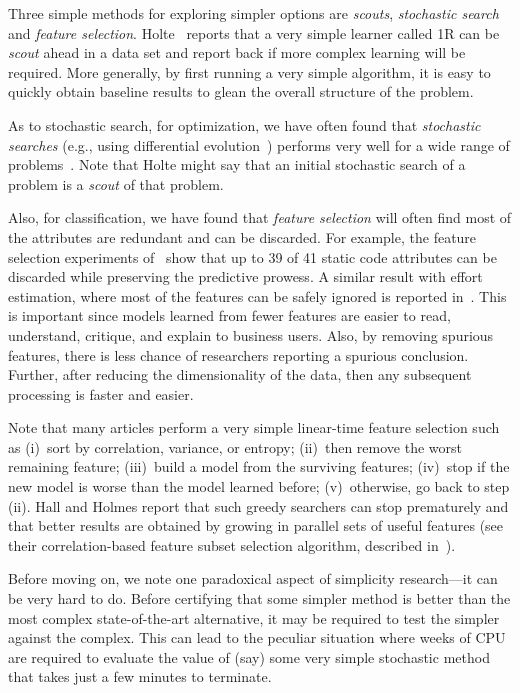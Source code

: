 \documentclass[preprint,10pt]{elsarticle}
\begin{document}
Three simple methods for exploring simpler options are {\em scouts}, {\em stochastic search} and {\em feature selection}. Holte~\cite{Holte1993} reports that a very simple learner called 1R can be {\em scout} ahead in a data set and report back if more complex learning will be required. More generally, by first running a very simple algorithm, it is easy to quickly obtain baseline results to glean the overall structure of the problem.

As to stochastic search, for optimization, we have often found that {\em stochastic searches} (e.g., using differential evolution~\cite{Storn1997}) performs very well for a wide range of problems~\cite{fu2016, agrawal16, agrawal18}.  Note that Holte might say that an initial stochastic search of a problem is a {\em scout} of that problem.

Also, for classification, we have found that {\em feature selection} will often find most of the attributes are redundant and can be discarded.  For example, the feature selection experiments of~\cite{menzies07} show that up to 39 of 41 static code attributes can be discarded while preserving the predictive prowess. A similar result with effort estimation, where most of the features can be safely ignored is reported in~\cite{chen2005}. This is important since models learned from fewer features are easier to read, understand, critique, and explain to business users. Also, by removing spurious features, there is less chance of researchers reporting a spurious conclusion. Further, after reducing the dimensionality of the data, then any subsequent processing is faster and easier.

Note that many articles perform a very simple linear-time feature selection such as (i)~sort by correlation, variance, or entropy; (ii)~then remove the worst remaining feature; (iii)~build a model from the surviving features; (iv)~stop if the new model is worse than the model learned before; (v)~otherwise, go back to step (ii).  Hall and Holmes report that such greedy searchers can stop prematurely and that better results are obtained by growing in parallel sets of useful features (see their 
correlation-based feature subset selection
algorithm, described in~\cite{hall2003benchmarking}).

Before moving on, we note one paradoxical aspect of simplicity research---it can be very hard to do. Before certifying that some simpler method is better than the most complex state-of-the-art alternative, it may be required to test the simpler against the complex. This can lead to the peculiar situation where weeks of CPU are required to evaluate the value of (say) some very simple stochastic method that takes just a few minutes to terminate.
\end{document}

